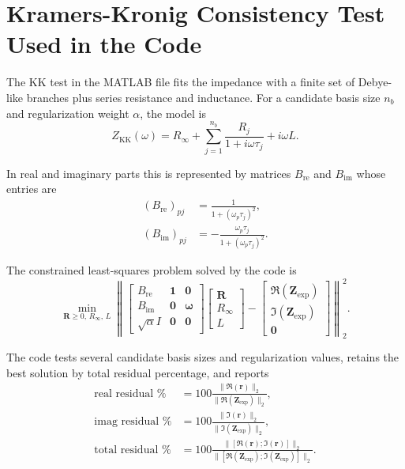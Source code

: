 \documentclass[11pt]{article}
\begin{document}
\section{Kramers-Kronig Consistency Test Used in the Code}

The KK test in the MATLAB file fits the impedance with a finite set of Debye-like branches plus series resistance and inductance. For a candidate basis size $n_b$ and regularization weight $\alpha$, the model is
\begin{equation}
Z_{\mathrm{KK}}(\omega) = R_{\infty} + \sum_{j=1}^{n_b} \frac{R_j}{1 + i\omega\tau_j} + i\omega L.
\end{equation}

In real and imaginary parts this is represented by matrices $B_{\mathrm{re}}$ and $B_{\mathrm{im}}$ whose entries are
\begin{align}
\left(B_{\mathrm{re}}\right)_{pj} &= \frac{1}{1 + (\omega_p \tau_j)^2}, \\
\left(B_{\mathrm{im}}\right)_{pj} &= -\frac{\omega_p \tau_j}{1 + (\omega_p \tau_j)^2}.
\end{align}

The constrained least-squares problem solved by the code is
\begin{equation}
\min_{\bm{R} \ge 0,\, R_{\infty},\, L}
\left\|
\begin{bmatrix}
B_{\mathrm{re}} & \bm{1} & \bm{0} \\
B_{\mathrm{im}} & \bm{0} & \bm{\omega} \\
\sqrt{\alpha}I & \bm{0} & \bm{0}
\end{bmatrix}
\begin{bmatrix}
\bm{R} \\
R_{\infty} \\
L
\end{bmatrix}
-
\begin{bmatrix}
\Re(\bm{Z}_{\mathrm{exp}}) \\
\Im(\bm{Z}_{\mathrm{exp}}) \\
\bm{0}
\end{bmatrix}
\right\|_2^2.
\end{equation}

The code tests several candidate basis sizes and regularization values, retains the best solution by total residual percentage, and reports
\begin{align}
\text{real residual \%} &= 100\frac{\|\Re(\bm{r})\|_2}{\|\Re(\bm{Z}_{\mathrm{exp}})\|_2}, \\
\text{imag residual \%} &= 100\frac{\|\Im(\bm{r})\|_2}{\|\Im(\bm{Z}_{\mathrm{exp}})\|_2}, \\
\text{total residual \%} &= 100\frac{\|[\Re(\bm{r});\Im(\bm{r})]\|_2}{\|[\Re(\bm{Z}_{\mathrm{exp}});\Im(\bm{Z}_{\mathrm{exp}})]\|_2}.
\end{align}
\end{document}
